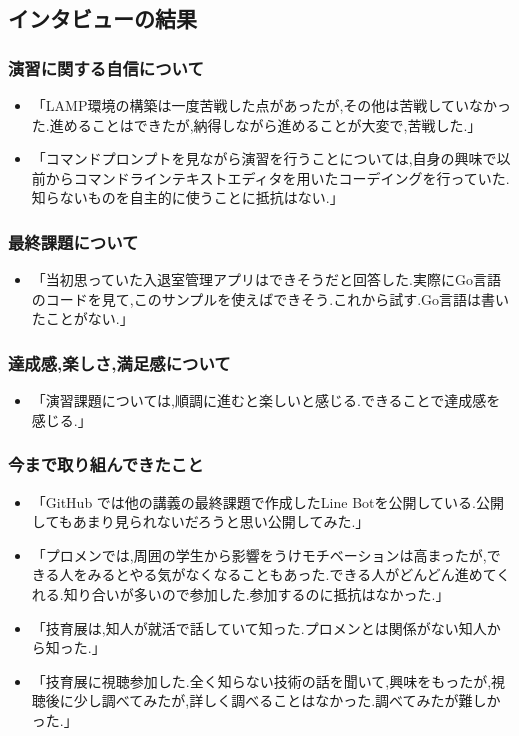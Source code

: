 \documentclass[11pt, a4paper]{jreport}
\begin{document}
\subsection{インタビューの結果}

\subsubsection{演習に関する自信について}

\begin{itemize}
\item 「LAMP環境の構築は一度苦戦した点があったが,その他は苦戦していなかった.進めることはできたが,納得しながら進めることが大変で,苦戦した.」
\item 「コマンドプロンプトを見ながら演習を行うことについては,自身の興味で以前からコマンドラインテキストエディタを用いたコーデイングを行っていた.知らないものを自主的に使うことに抵抗はない.」
\end{itemize}

\subsubsection{最終課題について}

\begin{itemize}
\item 「当初思っていた入退室管理アプリはできそうだと回答した.実際にGo言語のコードを見て,このサンプルを使えばできそう.これから試す.Go言語は書いたことがない.」
\end{itemize}

\subsubsection{達成感,楽しさ,満足感について}

\begin{itemize}
\item 「演習課題については,順調に進むと楽しいと感じる.できることで達成感を感じる.」
\end{itemize}

\subsubsection{今まで取り組んできたこと}

\begin{itemize}
\item 「GitHub では他の講義の最終課題で作成したLine Botを公開している.公開してもあまり見られないだろうと思い公開してみた.」
\item 「プロメンでは,周囲の学生から影響をうけモチベーションは高まったが,できる人をみるとやる気がなくなることもあった.できる人がどんどん進めてくれる.知り合いが多いので参加した.参加するのに抵抗はなかった.」
\item 「技育展は,知人が就活で話していて知った.プロメンとは関係がない知人から知った.」
\item 「技育展に視聴参加した.全く知らない技術の話を聞いて,興味をもったが,視聴後に少し調べてみたが,詳しく調べることはなかった.調べてみたが難しかった.」
\end{itemize}
\end{document}
